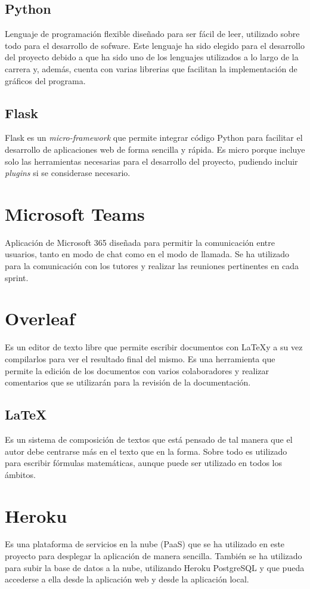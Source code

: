 \subsection{Python}
Lenguaje de programación flexible diseñado para ser fácil de leer, utilizado sobre todo para el desarrollo de sofware. Este lenguaje ha sido elegido para el desarrollo del proyecto debido a que ha sido uno de los lenguajes utilizados a lo largo de la carrera y, además, cuenta con varias librerias que facilitan la implementación de gráficos del programa.

\subsection{Flask}
Flask es un \textit{micro-framework} que permite integrar código Python para facilitar el desarrollo de aplicaciones web de forma sencilla y rápida. Es micro porque incluye solo las herramientas necesarias para el desarrollo del proyecto, pudiendo incluir \textit{plugins} si se considerase necesario.

\section{Microsoft Teams}
Aplicación de Microsoft 365 diseñada para permitir la comunicación entre usuarios, tanto en modo de chat como en el modo de llamada. Se ha utilizado para la comunicación con los tutores y realizar las reuniones pertinentes en cada sprint.

\section{Overleaf}
Es un editor de texto libre que permite escribir documentos con \LaTeX y a su vez compilarlos para ver el resultado final del mismo. Es una herramienta que permite la edición de los documentos con varios colaboradores y realizar comentarios que se utilizarán para la revisión de la documentación.
\subsection{\LaTeX}
Es un sistema de composición de textos que está pensado de tal manera que el autor debe centrarse más en el texto que en la forma. Sobre todo es utilizado para escribir fórmulas matemáticas, aunque puede ser utilizado en todos los ámbitos.

\section{Heroku}
Es una plataforma de servicios en la nube (PaaS) que se ha utilizado en este proyecto para desplegar la aplicación de manera sencilla. También se ha utilizado para subir la base de datos a la nube, utilizando Heroku PostgreSQL y que pueda accederse a ella desde la aplicación web y desde la aplicación local.

